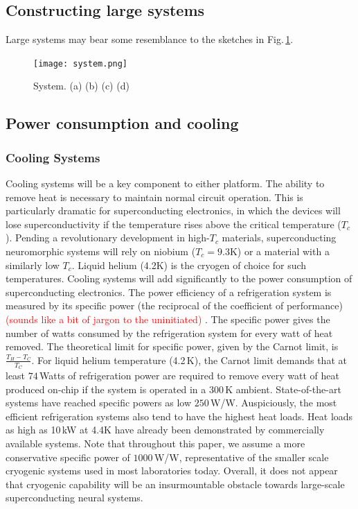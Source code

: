 \documentclass[twocolumn]{article}
\begin{document}
\subsection{Constructing large systems}

Large systems may bear some resemblance to the sketches in Fig.\,\ref{fig:system}.
\begin{figure}
    \centering
    \texttt{[image: system.png]}
    \caption{System. (a) (b) (c) (d)}
    \label{fig:system}
\end{figure}

\subsection{Power consumption and cooling}

\subsubsection{Cooling Systems}
Cooling systems will be a key component to either platform. The ability to remove heat is necessary to maintain normal circuit operation. This is particularly dramatic for superconducting electronics, in which the devices will lose superconductivity if the temperature rises above the critical temperature ($T_c$). Pending a revolutionary development in high-$T_c$ materials, superconducting neuromorphic systems will rely on niobium ($T_c = 9.3$K) or a material with a similarly low $T_c$. Liquid helium (4.2K) is the cryogen of choice for such temperatures. Cooling systems will add significantly to the power consumption of superconducting electronics. The power efficiency of a refrigeration system is measured by its specific power (the reciprocal of the coefficient of performance) \textcolor{red}{(sounds like a bit of jargon to the uninitiated)} \cite{}. The specific power gives the number of watts consumed by the refrigeration system for every watt of heat removed. The theoretical limit for specific power, given by the Carnot limit, is $\frac{T_H - T_C}{T_C}$. For liquid helium temperature (4.2\,K), the Carnot limit demands that at least $74$\,Watts of refrigeration power are required to remove every watt of heat produced on-chip if the system is operated in a 300\,K ambient. State-of-the-art systems have reached specific powers as low $250$\,W/W. Auspiciously, the most efficient refrigeration systems also tend to have the highest heat loads. Heat loads as high as 10\,kW at 4.4K have already been demonstrated by commercially available systems. Note that throughout this paper, we assume a more conservative specific power of $1000$\,W/W, representative of the smaller scale cryogenic systems used in most laboratories today. Overall, it does not appear that cryogenic capability will be an insurmountable obstacle towards large-scale superconducting neural systems.
\end{document}
